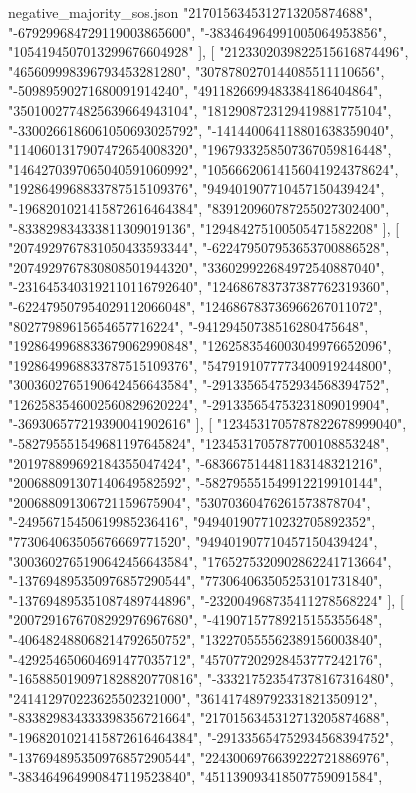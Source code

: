 \begin{filecontents*}[overwrite]{negative_majority_sos.json}
    "2170156345312713205874688",
    "-679299684729119003865600",
    "-383464964991005064953856",
    "1054194507013299676604928"
   ],
   [
    "2123302039822515616874496",
    "465609998396793453281280",
    "3078780270144085511110656",
    "-50989590271680091914240",
    "4911826699483384186404864",
    "3501002774825639664943104",
    "1812908723129419881775104",
    "-3300266186061050693025792",
    "-141440064118801638359040",
    "1140601317907472654008320",
    "1967933258507367059816448",
    "1464270397065040591060992",
    "10566620614156041924378624",
    "1928649968833787515109376",
    "949401907710457150439424",
    "-1968201021415872616464384",
    "839120960787255027302400",
    "-833829834333811309019136",
    "129484275100505471582208"
   ],
   [
    "2074929767831050433593344",
    "-622479507953653700886528",
    "2074929767830808501944320",
    "336029922684972540887040",
    "-2316453403192110116792640",
    "124686783737387762319360",
    "-622479507954029112066048",
    "124686783736966267011072",
    "80277989615654657716224",
    "-94129450738516280475648",
    "1928649968833679062990848",
    "1262583546003049976652096",
    "1928649968833787515109376",
    "5479191077773400919244800",
    "3003602765190642456643584",
    "-291335654752934568394752",
    "1262583546002560829620224",
    "-291335654753231809019904",
    "-369306577219390041902616"
   ],
   [
    "1234531705787822678999040",
    "-582795551549681197645824",
    "1234531705787700108853248",
    "201978899692184355047424",
    "-683667514481183148321216",
    "200688091307140649582592",
    "-582795551549912219910144",
    "200688091306721159675904",
    "53070360476261573878704",
    "-24956715450619985236416",
    "949401907710232705892352",
    "773064063505676669771520",
    "949401907710457150439424",
    "3003602765190642456643584",
    "1765275320902862241713664",
    "-137694895350976857290544",
    "773064063505253101731840",
    "-137694895351087489744896",
    "-232004968735411278568224"
   ],
   [
    "2007291676708292976967680",
    "-41907157789215155355648",
    "-406482488068214792650752",
    "132270555562389156003840",
    "-429254650604691477035712",
    "457077202928453777242176",
    "-1658850190971828820770816",
    "-333217523547378167316480",
    "241412970223625502321000",
    "361417489792331821350912",
    "-833829834333398356721664",
    "2170156345312713205874688",
    "-1968201021415872616464384",
    "-291335654752934568394752",
    "-137694895350976857290544",
    "2243006976639222721886976",
    "-383464964990847119523840",
    "451139093418507759091584",

\end{filecontents*}
